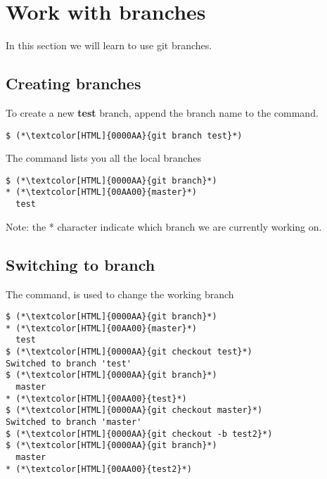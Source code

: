 \section{Work with branches}
\begin{frame}[fragile]
    \slidetitle
In this section we will learn to use git branches.

\end{frame}

\subsection{Creating branches}
\begin{frame}[fragile]
    \subslidetitle

To create a new \textbf{test} branch, append the branch name to the command.
\begin{lstlisting}
$ (*\textcolor[HTML]{0000AA}{git branch test}*)
\end{lstlisting}

The  command lists you all the local branches
\begin{lstlisting}
$ (*\textcolor[HTML]{0000AA}{git branch}*)
* (*\textcolor[HTML]{00AA00}{master}*)
  test
\end{lstlisting}

Note: the * character indicate which branch we are currently working on.
\end{frame}

\subsection{Switching to branch}
\begin{frame}[fragile]
    \subslidetitle
The  command, is used to change the working branch
\begin{lstlisting}
$ (*\textcolor[HTML]{0000AA}{git branch}*)
* (*\textcolor[HTML]{00AA00}{master}*)
  test
$ (*\textcolor[HTML]{0000AA}{git checkout test}*)
Switched to branch 'test'
$ (*\textcolor[HTML]{0000AA}{git branch}*)
  master
* (*\textcolor[HTML]{00AA00}{test}*)
$ (*\textcolor[HTML]{0000AA}{git checkout master}*)
Switched to branch 'master'
$ (*\textcolor[HTML]{0000AA}{git checkout -b test2}*)
$ (*\textcolor[HTML]{0000AA}{git branch}*)
  master
* (*\textcolor[HTML]{00AA00}{test2}*)
\end{lstlisting}
\end{frame}

